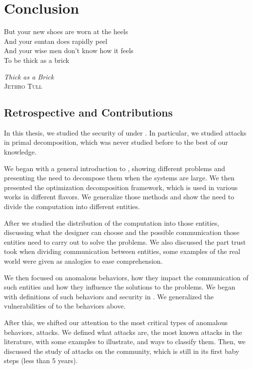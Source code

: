 \documentclass[../main.tex]{subfiles}
\begin{document}
\chapter{Conclusion}\label{sec:conclusion}
\epigraph{\centering But your new shoes are worn at the heels\\ And your suntan does rapidly peel\\ And your wise men don't know how it feels\\ To be thick as a brick}
{\textit{Thick as a Brick}\\\textsc{Jethro Tull}}

\section{Retrospective and Contributions}
\label{sec:retr-contr}
In this thesis, we studied the security of \cps{} under \dmpc{}.
In particular, we studied attacks in primal decomposition, which was never studied before to the best of our knowledge.

We began with a general introduction to \mpc{}, showing different \mpc{} problems and presenting the need to decompose them when the systems are large.
We then presented the optimization decomposition framework, which is used in various works in different flavors.
We generalize those methods and show the need to divide the computation into different entities.

After we studied the distribution of the computation into those entities, discussing what the designer can choose and the possible communication those entities need to carry out to solve the problems.
We also discussed the part trust took when dividing communication between entities, some examples of the real world were given as analogies to ease comprehension.

We then focused on anomalous behaviors, how they impact the communication of such entities and how they influence the solutions to the problems.
We began with definitions of such behaviors and security in \cps{}.
We generalized the vulnerabilities of \cps{} to the behaviors above.

After this, we shifted our attention to the most critical types of anomalous behaviors, attacks.
We defined what attacks are, the most known attacks in the literature, with some examples to illustrate, and ways to classify them.
Then, we discussed the study of attacks on the \dmpc{} community, which is still
in its first baby steps (less than 5 years).
\end{document}
